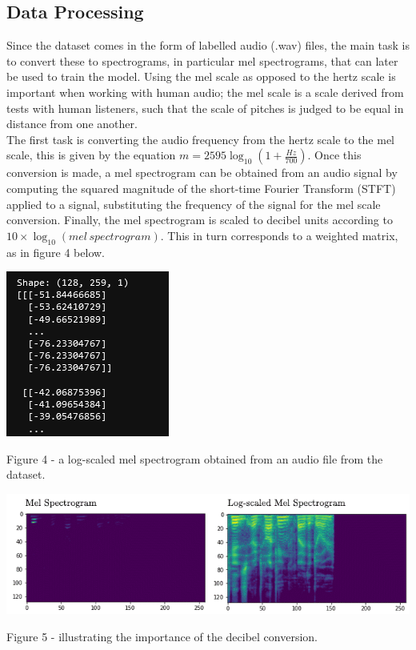 \documentclass[12pt]{article}
\begin{document}
\subsection{Data Processing}
Since the dataset comes in the form of labelled audio (.wav) files, the main task is to convert these to spectrograms, in particular mel spectrograms, that can later be used to train the model. Using the mel scale as opposed to the hertz scale is important when working with human audio; the mel scale is a scale derived from tests with human listeners, such that the scale of pitches is judged to be equal in distance from one another.
\\

\noindent The first task is converting the audio frequency from the hertz scale to the mel scale, this is given by the equation $m = 2595 \log_{10}\left(1 + \frac{Hz}{700}\right)$. Once this conversion is made, a mel spectrogram can be obtained from an audio signal by computing the squared magnitude of the short-time Fourier Transform (STFT) applied to a signal, substituting the frequency of the signal for the mel scale conversion. Finally, the mel spectrogram is scaled to decibel units according to $10 \times \log_{10}(mel \, spectrogram)$. This in turn corresponds to a weighted matrix, as in figure 4 below.
\\
\begin{center}
\includegraphics{figure_3_spectrogram_matrix}
\end{center}
Figure 4 - a log-scaled mel spectrogram obtained from an audio file from the dataset.
\begin{center}
\includegraphics{figure_5_log_spectrogram}
\end{center}
Figure 5 - illustrating the importance of the decibel conversion.
\\
\end{document}
